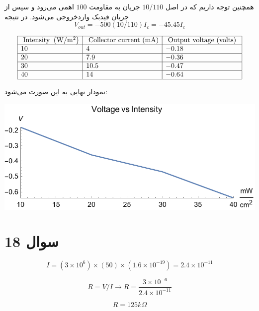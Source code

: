 \documentclass[12pt]{article}
\begin{document}
همچنین توجه داریم که در اصل $10/110$ جریان به مقاومت $100$ اهمی می‌رود و سپس از جریان فیدبک واردخروجی می‌شود. در نتیجه
$$V_{out} = -500 (10/110) I_c = -45.45 I_c$$


 $$
 \begin{array}{|l|l|l|}
 	\hline \text { Intensity }\left(\mathrm{W} / \mathrm{m}^{2}\right) & \text { Collector current }(\mathrm{mA}) & \text { Output voltage (volts) } \\
 	\hline 10 & 4 & -0.18 \\
 	\hline 20 & 7.9 & -0.36 \\
 	\hline 30 & 10.5 & -0.47 \\
 	\hline 40 & 14 & -0.64 \\
 	\hline
 \end{array}
 $$
 
 
 نمودار نهایی به این صورت می‌شود:
 
 
 \begin{center}
 	\includegraphics[width = 0.5 \textwidth]{images/16.pdf}
 \end{center}
 
 
 \section*{سوال 18}
 
 $$I = (3\times 10^6)\times(50)\times(1.6\times10^{-19}) =2.4 \times 10^{-11}$$
 
 $$R = V/I \rightarrow R = \frac{3\times 10^{-6}}{2.4\times10^{-11}}$$
 
 $$R=125 k\Omega$$
 
\end{document}
